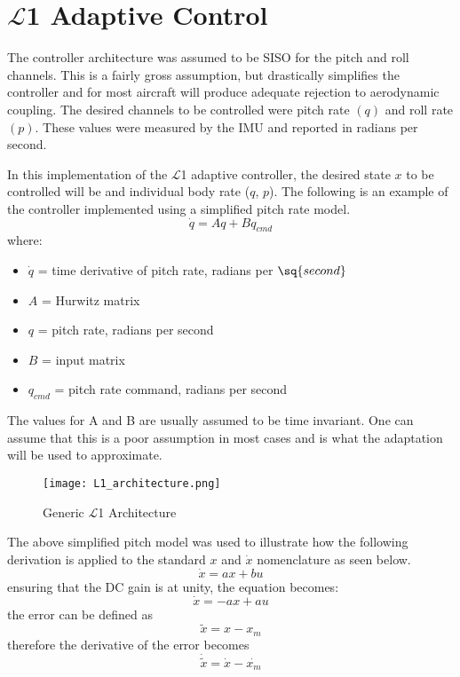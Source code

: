 \section{$\mathcal{L}$1 Adaptive Control}
The controller architecture was assumed to be \ac{SISO} for the pitch and roll channels.  This is a fairly gross assumption, but drastically simplifies the controller and for most aircraft will produce adequate rejection to aerodynamic coupling.  The desired channels to be controlled were pitch rate $(q)$ and roll rate $(p)$.  These values were measured by the \ac{IMU} and reported in radians per second.

In this implementation of the $\mathcal{L}$1 adaptive controller, the desired state $x$ to be controlled will be and individual body rate (\eg $q$, $p$).
The following is an example of the controller implemented using a simplified pitch rate model.
\begin{equation}
\dot{q}=Aq+Bq_{cmd}
\end{equation}
where: 
\begin{itemize}
	\item[] $\dot{q}$ = time derivative of pitch rate, radians per $\sq{second}$
	\item[] $A$ = Hurwitz matrix
	\item[] $q$ = pitch rate, radians per second
	\item[] $B$ = input matrix
	\item[] $q_{cmd}$ = pitch rate command, radians per second
\end{itemize}
The values for A and B are usually assumed to be time invariant.  One can assume that this is a poor assumption in most cases and is what the adaptation will be used to approximate.  

\begin{figure}[!h]
 \centering
  \texttt{[image: L1\_architecture.png]}
  \caption{Generic $\mathcal{L}$1 Architecture}
  \label{fig:l1_architecture}
\end{figure}

The above simplified pitch model was used to illustrate how the following derivation is applied to the standard $x$ and $\dot{x}$ nomenclature as seen below.
\begin{equation}
\dot{x} =ax+bu
\end{equation}
ensuring that the DC gain is at unity, the equation becomes:
\begin{equation}
\dot{x} =-ax+au
\end{equation}
the error can be defined as
\begin{equation}
\tilde{x}=x-x_m
\end{equation}
therefore the derivative of the error becomes
\begin{equation}
\dot{\tilde{x}}=\dot{x}-\dot{x_m}
\end{equation}









